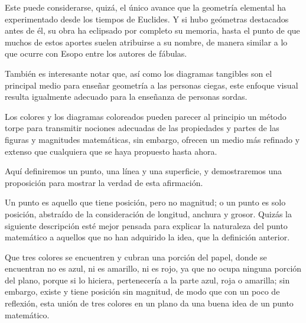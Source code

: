 \documentclass[booklanguage=english]{byrnebook}
\begin{document}
\baselineskip

Este puede considerarse, quizá, el único avance que la geometría elemental ha experimentado desde los tiempos de Euclides. Y si hubo geómetras destacados antes de él, su obra ha eclipsado por completo su memoria, hasta el punto de que muchos de estos aportes suelen atribuirse a su nombre, de manera similar a lo que ocurre con Esopo entre los autores de fábulas.

También es interesante notar que, así como los diagramas tangibles son el principal medio para enseñar geometría a las personas ciegas, este enfoque visual resulta igualmente adecuado para la enseñanza de personas sordas.


\pagebreak

Los colores y los diagramas coloreados pueden parecer al principio un método torpe para transmitir nociones adecuadas de las propiedades y partes de las figuras y magnitudes matemáticas, sin embargo, ofrecen un medio más refinado y extenso que cualquiera que se haya propuesto hasta ahora.

Aquí definiremos un punto, una línea y una superficie, y demostraremos una proposición para mostrar la verdad de esta afirmación.

Un punto es aquello que tiene posición, pero no magnitud; o un punto es solo posición, abstraído de la consideración de longitud, anchura y grosor. Quizás la siguiente descripción esté mejor pensada para explicar la naturaleza del punto matemático a aquellos que no han adquirido la idea, que la definición anterior.

Que tres colores \drawCurrentPictureInMargin se encuentren y cubran una porción del papel, donde se encuentran no es azul, ni es amarillo, ni es rojo, ya que no ocupa ninguna porción del plano, porque si lo hiciera, pertenecería a la parte azul, roja o amarilla; sin embargo, existe y tiene posición sin magnitud, de modo que con un poco de reflexión, esta unión de tres colores en un plano da una buena idea de un punto matemático.
\end{document}

